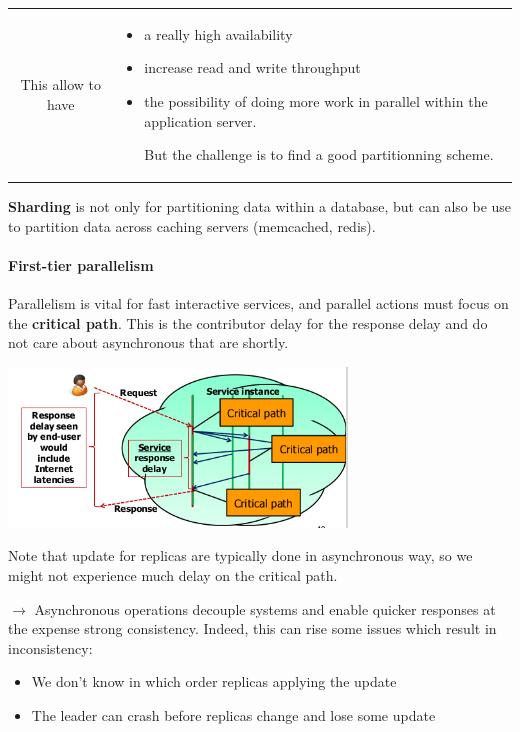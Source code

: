 \begin{itemize}
        \begin{tabular}{cm{10cm}}
            This allow to have &
            \begin{itemize}
                \item a really high availability
                \item increase read and write throughput
                \item the possibility 
                    of doing more work in parallel within the application server.
                \item[But] the challenge is to find a good partitionning scheme.
            \end{itemize}
        \end{tabular}

        \textbf{Sharding} is not only for partitioning data 
        within a database, but can also be use to partition data across caching 
        servers (memcached, redis).
\end{itemize}

\paragraph{First-tier parallelism}
Parallelism is vital for fast interactive services, and 
parallel actions must focus on the \textbf{critical path}. This is the
contributor delay for the response delay and do
not care about asynchronous that are shortly.

\begin{center}
    \includegraphics[width=9cm]{img/critical}
\end{center}


Note that update for replicas are typically done in asynchronous way, so we
might not experience much delay on the critical path.

$\rightarrow$ Asynchronous operations decouple systems and 
enable quicker responses at the expense strong 
consistency.
Indeed, this can rise some issues which result in inconsistency:
\begin{itemize}
    \item We don't know in which order replicas applying the update
    \item The leader can crash before replicas change and lose some
        update
\end{itemize}



